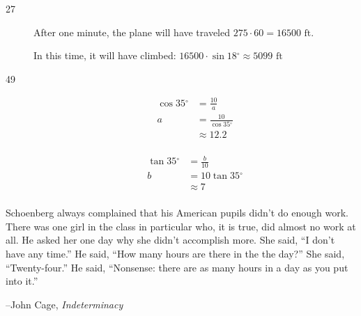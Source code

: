 \documentclass[fleqn,addpoints]{exam}
\newcommand{\degree}{\ensuremath{^\circ}}
\begin{document}
\begin{description}
\item[27]
After one minute, the plane will have traveled $275 \cdot 60 = 16500 \text{ ft}.$  

In this time, it will have climbed: $16500 \cdot \sin 18 \degree \approx 5099 \text{ ft}$

\item[49]

\begin{align*}
  \cos 35 \degree &= \frac{10}{a} \\
  a &= \frac{10}{\cos 35 \degree} \\
    &\approx 12.2 \\
\end{align*}

\begin{align*}
  \tan 35 \degree &= \frac{b}{10} \\
  b &= 10 \tan 35 \degree \\
    &\approx 7 \\
\end{align*}

\end{description}


\else

\vspace{2.5 in}

\begin{em}
Schoenberg always complained that his American pupils didn't do enough work.  There was one girl in the class in
particular who, it is true, did almost no work at all.  He asked her one day why she didn't accomplish more.  She said,
``I don't have any time.''  He said, ``How many hours are there in the the day?''  She said, ``Twenty-four.''  He said,
``Nonsense: there are as many hours in a day as you put into it.''
\end{em}

\vspace{.2 cm}
\hspace{1.5 cm} --John Cage, {\em Indeterminacy}

\fi
\end{document}
